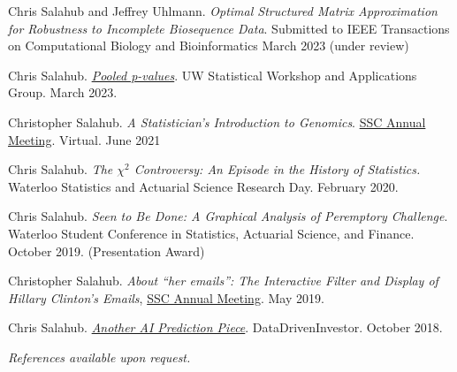 \documentclass[a4paper,11pt]{article}
\newenvironment{compactDesc}
{ \begin{description}
		\setlength{\itemsep}{2pt}
		\setlength{\parskip}{2pt}
		\setlength{\parsep}{1pt}     }
	{ \end{description}                  }
\begin{document}
\begin{compactDesc}
	\item 
	Chris Salahub and Jeffrey Uhlmann. \textit{Optimal Structured Matrix Approximation for Robustness to Incomplete Biosequence Data}. Submitted to IEEE Transactions on Computational Biology and Bioinformatics March 2023 (under review)
	\item
	Chris Salahub. \href{https://uwswagclub.github.io/workshop-bookdown/pooled-p-values.html}{\textit{Pooled p-values}}. UW Statistical Workshop and Applications Group. March 2023.
	\item
	Christopher Salahub. \textit{A Statistician's Introduction to Genomics}. \href{https://ssc.ca/en/meetings/past}{SSC Annual Meeting}. Virtual. June 2021
	\item
	Chris Salahub. \textit{The $\chi^2$ Controversy: An Episode in the History of Statistics.} Waterloo Statistics and Actuarial Science Research Day. February 2020.
	\item 
	Chris Salahub. \textit{Seen to Be Done: A Graphical Analysis of Peremptory Challenge}. Waterloo Student Conference in Statistics, Actuarial Science, and Finance. October 2019. (Presentation Award)
	\item
	Christopher Salahub. \textit{About ``her emails'': The Interactive Filter and Display of Hillary Clinton's Emails}, \href{https://ssc.ca/en/meetings/past}{SSC Annual Meeting}. May 2019.
	\item
	Chris Salahub. \href{https://medium.com/datadriveninvestor/another-ai-prediction-piece-45f36e6398a}{\textit{Another AI Prediction Piece}}. DataDrivenInvestor. October 2018.
\end{compactDesc}

\begin{center}	
	{\large \textit{References available upon request.}}
\end{center}
\end{document}
